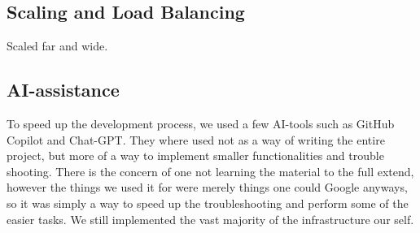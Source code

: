 \subsection{Scaling and Load Balancing}

Scaled far and wide.

\subsection{AI-assistance}

To speed up the development process, we used a few AI-tools such as GitHub Copilot and Chat-GPT. They where used not as a way of writing the entire project, but more of a way to implement smaller functionalities and trouble shooting. There is the concern of one not learning the material to the full extend, however the things we used it for were merely things one could Google anyways, so it was simply a way to speed up the troubleshooting and perform some of the easier tasks. We still implemented the vast majority of the infrastructure our self.